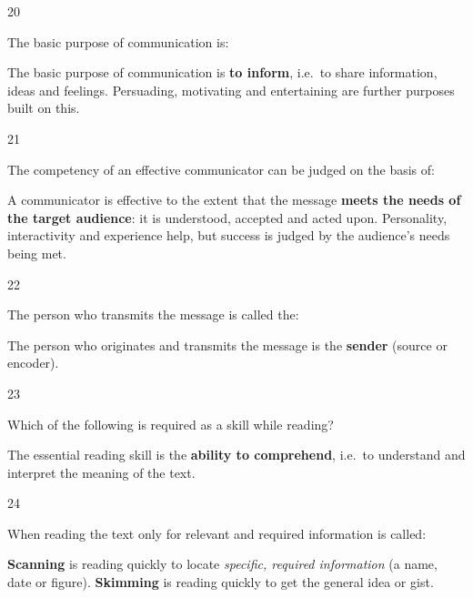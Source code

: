 \begin{question}{20}
{The basic purpose of communication is:\par}
\begin{explain}
The basic purpose of communication is \textbf{to inform}, i.e.\ to share information, ideas and feelings. Persuading, motivating and entertaining are further purposes built on this.
\end{explain}
\end{question}

\begin{question}{21}
{The competency of an effective communicator can be judged on the basis of:\par}
\begin{explain}
A communicator is effective to the extent that the message \textbf{meets the needs of the target audience}: it is understood, accepted and acted upon. Personality, interactivity and experience help, but success is judged by the audience's needs being met.
\end{explain}
\end{question}

\begin{question}{22}
{The person who transmits the message is called the:\par}
\begin{explain}
The person who originates and transmits the message is the \textbf{sender} (source or encoder).
\end{explain}
\end{question}

\begin{question}{23}
{Which of the following is required as a skill while reading?\par}
\begin{explain}
The essential reading skill is the \textbf{ability to comprehend}, i.e.\ to understand and interpret the meaning of the text.
\end{explain}
\end{question}

\begin{question}{24}
{When reading the text only for relevant and required information is called:\par}
\begin{explain}
\textbf{Scanning} is reading quickly to locate \emph{specific, required information} (a name, date or figure). \textbf{Skimming} is reading quickly to get the general idea or gist.
\end{explain}
\end{question}


